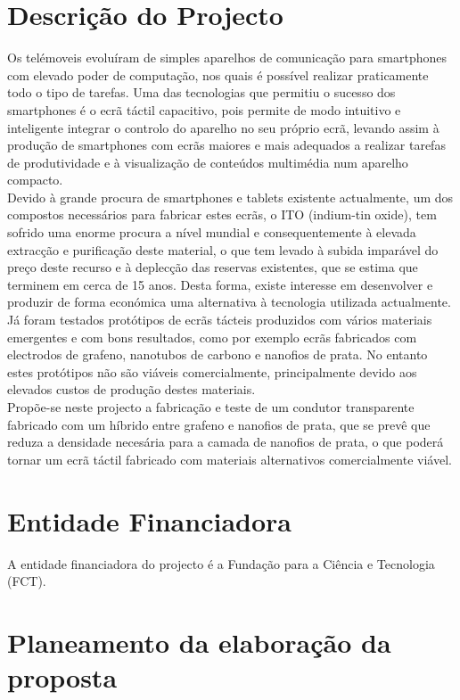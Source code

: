 \documentclass[%
	nofootinbib,
	amsmath,amssymb,
	aps,
	12pt,
	a4paper
]{article}
\begin{document}
\section{Descrição do Projecto}
Os telémoveis evoluíram de simples aparelhos de comunicação para smartphones com elevado poder de computação, nos quais é possível realizar praticamente todo o tipo de tarefas. Uma das tecnologias que permitiu o sucesso dos smartphones é o ecrã táctil capacitivo, pois permite de modo intuitivo e inteligente integrar o controlo do aparelho no seu próprio ecrã, levando assim à produção de smartphones com ecrãs maiores e mais adequados a realizar tarefas de produtividade e à visualização de conteúdos multimédia num aparelho compacto.\\
Devido à grande procura de smartphones e tablets existente actualmente, um dos compostos necessários para fabricar estes ecrãs, o ITO (indium-tin oxide), tem sofrido uma enorme procura a nível mundial e consequentemente à elevada extracção e purificação deste material, o que tem levado à subida imparável do preço deste recurso e à deplecção das reservas existentes, que se estima que terminem em cerca de 15 anos. Desta forma, existe interesse em desenvolver e produzir de forma económica uma alternativa à tecnologia utilizada actualmente.\\
Já foram testados protótipos de ecrãs tácteis produzidos com vários materiais emergentes e com bons resultados, como por exemplo ecrãs fabricados com electrodos de grafeno, nanotubos de carbono e nanofios de prata. No entanto estes protótipos não são viáveis comercialmente, principalmente devido aos elevados custos de produção destes materiais.\\
Propõe-se neste projecto a fabricação e teste de um condutor transparente fabricado com um híbrido entre grafeno e nanofios de prata, que se prevê que reduza a densidade necesária para a camada de nanofios de prata, o que poderá tornar um ecrã táctil fabricado com materiais alternativos comercialmente viável.

\section{Entidade Financiadora}
A entidade financiadora do projecto é a Fundação para a Ciência e Tecnologia (FCT).

\section{Planeamento da elaboração da proposta}
\end{document}
